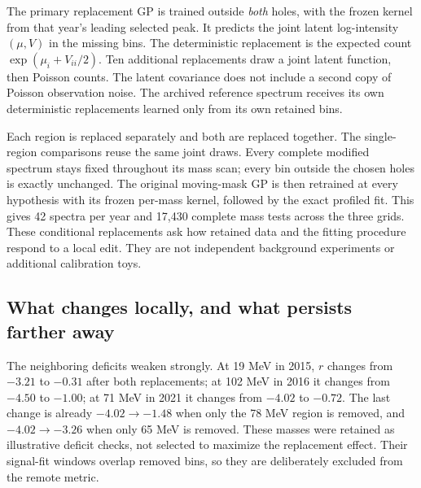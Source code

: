 The primary replacement GP is trained outside \emph{both} holes, with the frozen kernel from that year's leading selected peak. It predicts the joint latent log-intensity $(\mu,V)$ in the missing bins. The deterministic replacement is the expected count $\exp(\mu_i+V_{ii}/2)$. Ten additional replacements draw a joint latent function, then Poisson counts. The latent covariance does not include a second copy of Poisson observation noise. The archived reference spectrum receives its own deterministic replacements learned only from its own retained bins.

Each region is replaced separately and both are replaced together. The single-region comparisons reuse the same joint draws. Every complete modified spectrum stays fixed throughout its mass scan; every bin outside the chosen holes is exactly unchanged. The original moving-mask GP is then retrained at every hypothesis with its frozen per-mass kernel, followed by the exact profiled fit. This gives 42 spectra per year and 17,430 complete mass tests across the three grids. These conditional replacements ask how retained data and the fitting procedure respond to a local edit. They are not independent background experiments or additional calibration toys.

\clearpage
{}

\clearpage
\subsection*{What changes locally, and what persists farther away}
The neighboring deficits weaken strongly. At 19 MeV in 2015, $r$ changes from $-3.21$ to $-0.31$ after both replacements; at 102 MeV in 2016 it changes from $-4.50$ to $-1.00$; at 71 MeV in 2021 it changes from $-4.02$ to $-0.72$. The last change is already $-4.02\to-1.48$ when only the 78 MeV region is removed, and $-4.02\to-3.26$ when only 65 MeV is removed. These masses were retained as illustrative deficit checks, not selected to maximize the replacement effect. Their signal-fit windows overlap removed bins, so they are deliberately excluded from the remote metric.

